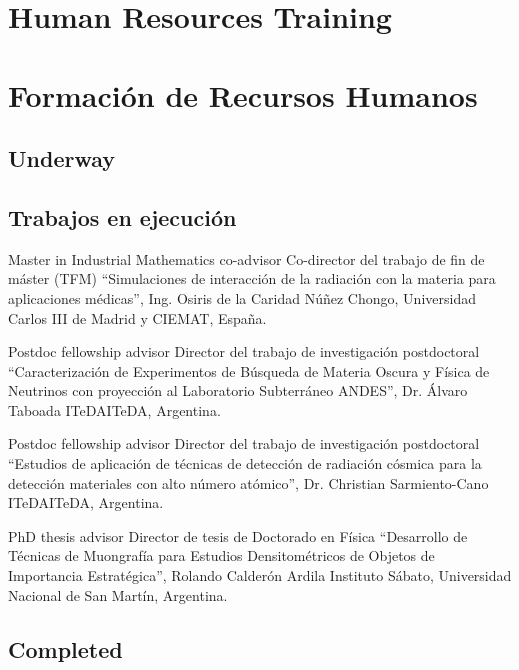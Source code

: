 \ifeng
\section*{Human Resources Training}
\else
\section*{Formación de Recursos Humanos}
\fi

\ifeng
	\subsection*{Underway}
\else
	\subsection*{Trabajos en ejecución}
\fi

\ifeng
Master in Industrial Mathematics co-advisor
\else
Co-director del trabajo de fin de máster (TFM)
\fi
``Simulaciones de interacción de la radiación con la materia para aplicaciones médicas'', Ing. Osiris de la Caridad Núñez Chongo, Universidad Carlos III de Madrid y CIEMAT, España.

\ifeng
Postdoc fellowship advisor
\else
Director del trabajo de investigación postdoctoral
\fi
``Caracterización de Experimentos de Búsqueda de Materia Oscura y Física de Neutrinos con proyección al Laboratorio Subterráneo ANDES'', Dr. Álvaro Taboada \at \ifeng ITeDA\else ITeDA\fi, Argentina.

\ifeng
Postdoc fellowship advisor
\else
Director del trabajo de investigación postdoctoral
\fi
``Estudios de aplicación de técnicas de detección de radiación cósmica para la detección materiales con alto número atómico'', Dr. Christian Sarmiento-Cano \at \ifeng ITeDA\else ITeDA\fi, Argentina.

\ifeng
PhD thesis advisor
 \else
Director de tesis de Doctorado en Física
 \fi
``Desarrollo de Técnicas de Muongrafía para Estudios Densitométricos de Objetos de Importancia Estratégica'', Rolando Calderón Ardila \at Instituto Sábato, Universidad Nacional de San Martín, Argentina.

\ifeng
\subsection*{Completed}
\else
